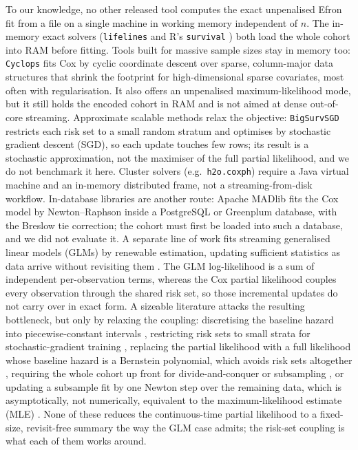 \documentclass[11pt,a4paper]{article}
\begin{document}
To our knowledge, no other released tool computes the exact unpenalised Efron
fit from a file on a single machine in working memory independent of $n$. The
in-memory exact solvers
(\texttt{lifelines} \citep{davidsonpilon2019lifelines} and R's
\texttt{survival} \citep{therneau2000modeling}) both load
the whole cohort into RAM before fitting. Tools built for massive sample sizes
stay in memory too: \texttt{Cyclops} fits Cox by cyclic coordinate descent over
sparse, column-major data structures \citep{mittal2014highdim} that shrink the
footprint for high-dimensional sparse covariates, most often with
regularisation. It also offers an unpenalised maximum-likelihood mode, but it
still holds the encoded cohort in RAM and is not aimed at dense out-of-core
streaming. Approximate scalable methods relax the objective:
\texttt{BigSurvSGD} \citep{tarkhan2020bigsurvsgd,tarkhan2024online} restricts
each risk set to a small random stratum and optimises by stochastic gradient
descent (SGD), so each update touches few rows; its result is a stochastic
approximation, not the maximiser of the full partial likelihood, and we do not
benchmark it here. Cluster
solvers (e.g.\ \texttt{h2o.coxph}) require a Java virtual machine and an
in-memory distributed frame, not a streaming-from-disk workflow. In-database
libraries are another route: Apache MADlib \citep{hellerstein2012madlib} fits
the Cox model by Newton--Raphson inside a PostgreSQL or Greenplum database,
with the Breslow tie correction; the cohort must first be loaded into such a
database, and we did not evaluate it. A separate
line of work fits streaming generalised linear models (GLMs) by renewable
estimation, updating sufficient statistics as data arrive without revisiting
them \citep{luo2020renewable}. The GLM log-likelihood is a sum
of independent per-observation terms, whereas the Cox partial likelihood
couples every observation through the shared risk set, so those incremental
updates do not carry over in exact form. A sizeable literature attacks the
resulting bottleneck, but only by relaxing the coupling: discretising the
baseline hazard into piecewise-constant intervals \citep{wu2021online},
restricting risk sets to small strata for stochastic-gradient training
\citep{tarkhan2024online}, replacing the partial likelihood with a full
likelihood whose baseline hazard is a Bernstein polynomial, which avoids risk
sets altogether \citep{hu2024privacy}, requiring the whole cohort up front for
divide-and-conquer \citep{wang2021divide} or subsampling \citep{qiao2023optimal},
or updating a subsample fit by one Newton step over the remaining data, which
is asymptotically, not numerically, equivalent to the maximum-likelihood
estimate (MLE) \citep{wang2024fitting}. None of these reduces the
continuous-time partial likelihood to a fixed-size, revisit-free summary the
way the GLM case admits; the risk-set coupling is what each of them works
around.
\end{document}
